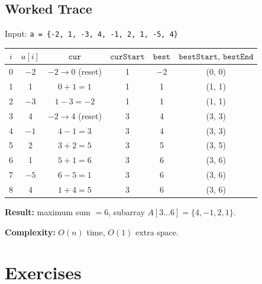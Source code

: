 \subsection{Worked Trace}

Input: \texttt{a = \{-2, 1, -3, 4, -1, 2, 1, -5, 4\}}

\begin{center}
\begin{tabular}{cccccc}
\toprule
$i$ & $a[i]$ & $\texttt{cur}$ & $\texttt{curStart}$ & $\texttt{best}$ & $\texttt{bestStart, bestEnd}$ \\
\midrule
0 & $-2$ & $-2 \to 0$ (reset) & 1 & $-2$ & (0, 0) \\
1 & 1 & $0 + 1 = 1$ & 1 & 1 & (1, 1) \\
2 & $-3$ & $1 - 3 = -2$ & 1 & 1 & (1, 1) \\
3 & 4 & $-2 \to 4$ (reset) & 3 & 4 & (3, 3) \\
4 & $-1$ & $4 - 1 = 3$ & 3 & 4 & (3, 3) \\
5 & 2 & $3 + 2 = 5$ & 3 & 5 & (3, 5) \\
6 & 1 & $5 + 1 = 6$ & 3 & 6 & (3, 6) \\
7 & $-5$ & $6 - 5 = 1$ & 3 & 6 & (3, 6) \\
8 & 4 & $1 + 4 = 5$ & 3 & 6 & (3, 6) \\
\bottomrule
\end{tabular}
\end{center}

\textbf{Result:} maximum sum $= 6$, subarray $A[3 \ldots 6] = \{4, -1, 2, 1\}$.

\textbf{Complexity:} $O(n)$ time, $O(1)$ extra space.

\section{Exercises}


